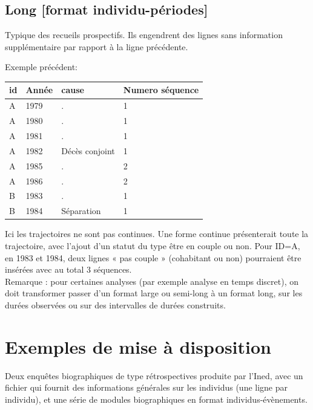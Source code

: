 \documentclass[
  12pt,
  letterpaper,
  DIV=11,
  numbers=noendperiod,
  onepage,
  openany]{scrreprt}
\begin{document}
\hypertarget{long-format-individu-puxe9riodes}{%
\subsection{Long {[}format
individu-périodes{]}}\label{long-format-individu-puxe9riodes}}

Typique des recueils prospectifs. Ils engendrent des lignes sans
information supplémentaire par rapport à la ligne précédente.

Exemple précédent:

\begin{longtable}[]{@{}llll@{}}
\toprule\noalign{}
id & Année & cause & Numero séquence \\
\midrule\noalign{}
\endhead
\bottomrule\noalign{}
\endlastfoot
A & 1979 & . & 1 \\
A & 1980 & . & 1 \\
A & 1981 & . & 1 \\
A & 1982 & Décès conjoint & 1 \\
A & 1985 & . & 2 \\
A & 1986 & . & 2 \\
B & 1983 & . & 1 \\
B & 1984 & Séparation & 1 \\
\end{longtable}

Ici les trajectoires ne sont pas continues. Une forme continue
présenterait toute la trajectoire, avec l'ajout d'un statut du type être
en couple ou non. Pour ID=A, en 1983 et 1984, deux lignes « pas couple »
(cohabitant ou non) pourraient être insérées avec au total 3
séquences.\\
Remarque : pour certaines analyses (par exemple analyse en temps
discret), on doit transformer passer d'un format large ou semi-long à un
format long, sur les durées observées ou sur des intervalles de durées
construits.

\hypertarget{exemples-de-mise-uxe0-disposition}{%
\section{\texorpdfstring{\textbf{Exemples de mise à
disposition}}{Exemples de mise à disposition}}\label{exemples-de-mise-uxe0-disposition}}

Deux enquêtes biographiques de type rétrospectives produite par l'Ined,
avec un fichier qui fournit des informations générales sur les individus
(une ligne par individu), et une série de modules biographiques en
format individus-évènements.
\end{document}

